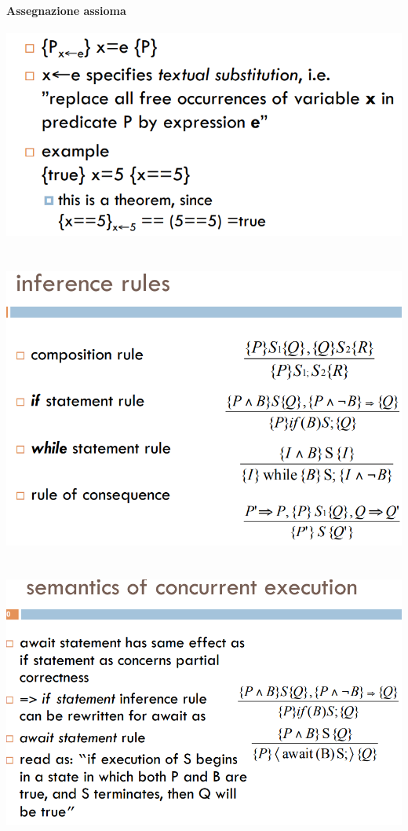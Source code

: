 \documentclass[10pt,a4paper]{article}
\begin{document}
\paragraph{Assegnazione assioma\\}
\includegraphics[scale=0.45]{img/ax.png} \\ \\ \\
\includegraphics[scale=0.45]{img/inference.png} \\ \\ \\
\includegraphics[scale=0.45]{img/inf2.png} \\ \\ \\
\end{document}
